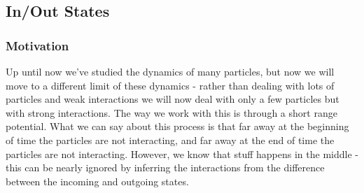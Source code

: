 \documentclass{article}
\begin{document}
\subsection{In/Out States}
\subsubsection{Motivation}
Up until now we've studied the dynamics of many particles, but now we will move to a different limit of these dynamics - rather than dealing with lots of particles and weak interactions we will now deal with only a few particles but with strong interactions. The way we work with this is through a short range potential. What we can say about this process is that far away at the beginning of time the particles are not interacting, and far away at the end of time the particles are not interacting. However, we know that stuff happens in the middle - this can be nearly ignored by inferring the interactions from the difference between the incoming and outgoing states.
\end{document}
